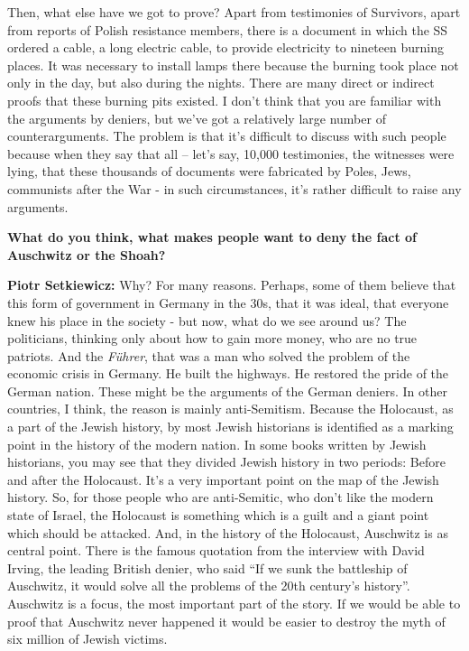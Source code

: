 Then, what else have we got to prove? Apart from testimonies of Survivors, apart from reports of Polish resistance members, there is a document in which the SS ordered a cable, a long electric cable, to provide electricity to nineteen burning places. It was necessary to install lamps there because the burning took place not only in the day, but also during the nights. There are many direct or indirect proofs that these burning pits existed. I don’t think that you are familiar with the arguments by deniers, but we’ve got a relatively large number of counterarguments. The problem is that it’s difficult to discuss with such people because when they say that all – let’s say, 10,000 testimonies, the witnesses were lying, that these thousands of documents were fabricated by Poles, Jews, communists after the War - in such circumstances, it’s rather difficult to raise any arguments.

\textbf{What do you think, what makes people want to deny the fact of Auschwitz or the Shoah?}

\textbf{Piotr Setkiewicz:} Why? For many reasons. Perhaps, some of them believe that this form of government in Germany in the 30s, that it was ideal, that everyone knew his place in the society - but now, what do we see around us? The politicians, thinking only about how to gain more money, who are no true patriots. And the \textit{Führer}, that was a man who solved the problem of the economic crisis in Germany. He built the highways. He restored the pride of the German nation. These might be the arguments of the German deniers. In other countries, I think, the reason is mainly anti-Semitism. Because the Holocaust, as a part of the Jewish history, by most Jewish historians is identified as a marking point in the history of the modern nation. In some books written by Jewish historians, you may see that they divided Jewish history in two periods: Before and after the Holocaust. It’s a very important point on the map of the Jewish history. So, for those people who are anti-Semitic, who don’t like the modern state of Israel, the Holocaust is something which is a guilt and a giant point which should be attacked. And, in the history of the Holocaust, Auschwitz is as central point. There is the famous quotation from the interview with David Irving, the leading British denier, who said ``If we sunk the battleship of Auschwitz, it would solve all the problems of the 20th century’s history''. Auschwitz is a focus, the most important part of the story. If we would be able to proof that Auschwitz never happened it would be easier to destroy the myth of six million of Jewish victims.

